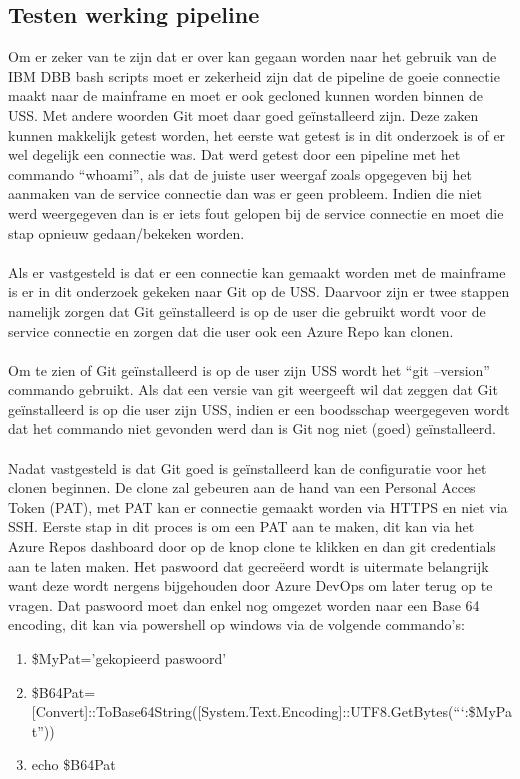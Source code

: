 \subsection{Testen werking pipeline}
Om er zeker van te zijn dat er over kan gegaan worden naar het gebruik van de IBM DBB bash scripts moet er zekerheid zijn dat de pipeline de goeie connectie maakt naar de mainframe en moet er ook gecloned kunnen worden binnen de USS. Met andere woorden Git moet daar goed geïnstalleerd zijn. Deze zaken kunnen makkelijk getest worden, het eerste wat getest is in dit onderzoek is of er wel degelijk een connectie was. Dat werd getest door een pipeline met het commando \enquote{whoami}, als dat de juiste user weergaf zoals opgegeven bij het aanmaken van de service connectie dan was er geen probleem. Indien die niet werd weergegeven dan is er iets fout gelopen bij de service connectie en moet die stap opnieuw gedaan/bekeken worden. 
\\ \\
Als er vastgesteld is dat er een connectie kan gemaakt worden met de mainframe is er in dit onderzoek gekeken naar Git op de USS. Daarvoor zijn er twee stappen namelijk zorgen dat Git geïnstalleerd is op de user die gebruikt wordt voor de service connectie en zorgen dat die user ook een Azure Repo kan clonen. 
\\ \\
Om te zien of Git geïnstalleerd is op de user zijn USS wordt het \enquote{git --version} commando gebruikt. Als dat een versie van git weergeeft wil dat zeggen dat Git geïnstalleerd is op die user zijn USS, indien er een boodsschap weergegeven wordt dat het commando niet gevonden werd dan is Git nog niet (goed) geïnstalleerd. 
\\ \\ 
Nadat vastgesteld is dat Git goed is geïnstalleerd kan de configuratie voor het clonen beginnen. De clone zal gebeuren aan de hand van een Personal Acces Token (PAT), met PAT kan er connectie gemaakt worden via HTTPS en niet via SSH. Eerste stap in dit proces is om een PAT aan te maken, dit kan via het Azure Repos dashboard door op de knop clone te klikken en dan git credentials aan te laten maken. Het paswoord dat gecreëerd wordt is uitermate belangrijk want deze wordt nergens bijgehouden door Azure DevOps om later terug op te vragen. Dat paswoord moet dan enkel nog omgezet worden naar een Base 64 encoding, dit kan via powershell op windows via de volgende commando's:
\begin{enumerate}
    \item \$MyPat='gekopieerd paswoord'
    \item \$B64Pat=[Convert]::ToBase64String([System.Text.Encoding]::UTF8.GetBytes(\textquotedblleft`:\$MyPat\textquotedblright))
    \item echo \$B64Pat
\end{enumerate}
